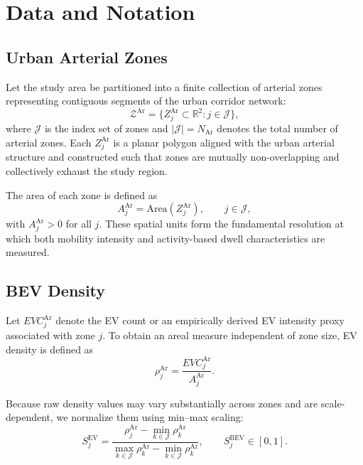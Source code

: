 \documentclass[conference]{IEEEtran}
\begin{document}
\section{Data and Notation}

\subsection{Urban Arterial Zones}

Let the study area be partitioned into a finite collection of arterial
zones representing contiguous segments of the urban corridor network:
\begin{equation}
\mathcal{Z}^{\mathrm{Ar}} =
\{ Z^{\mathrm{Ar}}_j \subset \mathbb{R}^2 : j \in \mathcal{J} \},
\end{equation}
where $\mathcal{J}$ is the index set of zones and
$|\mathcal{J}| = N_{\mathrm{Ar}}$ denotes the total number of arterial
zones. Each $Z^{\mathrm{Ar}}_j$ is a planar polygon aligned with the
urban arterial structure and constructed such that zones are mutually
non-overlapping and collectively exhaust the study region.

The area of each zone is defined as
\begin{equation}
A^{\mathrm{Ar}}_j =
\mathrm{Area}(Z^{\mathrm{Ar}}_j), \qquad j\in\mathcal{J},
\end{equation}
with $A^{\mathrm{Ar}}_j > 0$ for all $j$. These spatial units form the
fundamental resolution at which both mobility intensity and
activity-based dwell characteristics are measured.

\subsection{BEV Density}

Let $EVC^{\mathrm{Ar}}_j$ denote the EV
count or an empirically derived EV intensity proxy associated with
zone $j$. To obtain an areal measure independent of zone size, EV density is defined as
\begin{equation}
\rho^{\mathrm{Ar}}_j =
\frac{EVC^{\mathrm{Ar}}_j}{A^{\mathrm{Ar}}_j}.
\end{equation}

Because raw density values may vary substantially across zones and are
scale-dependent, we normalize them using min--max scaling:
\begin{equation}
S^{\mathrm{EV}}_j =
\frac{\rho^{\mathrm{Ar}}_j -
\min_{k\in\mathcal{J}} \rho^{\mathrm{Ar}}_k}
{\max_{k\in\mathcal{J}} \rho^{\mathrm{Ar}}_k -
\min_{k\in\mathcal{J}} \rho^{\mathrm{Ar}}_k},
\qquad S^{\mathrm{BEV}}_j\in[0,1].
\end{equation}
\end{document}
